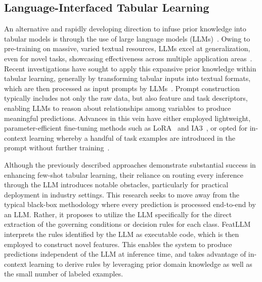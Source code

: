 \subsection{Language-Interfaced Tabular Learning}

An alternative and rapidly developing direction to infuse prior knowledge into tabular models is through the use of large language models (LLMs)~\cite{anil2023palm,openai2023gpt4}. Owing to pre-training on massive, varied textual resources, LLMs excel at generalization, even for novel tasks, showcasing effectiveness across multiple application areas~\cite{brown2020language}. Recent investigations have sought to apply this expansive prior knowledge within tabular learning, generally by transforming tabular inputs into textual formats, which are then processed as input prompts by LLMs~\cite{dinh2022lift,hegselmann2023tabllm,wang2023anypredict}. Prompt construction typically includes not only the raw data, but also feature and task descriptors, enabling LLMs to reason about relationships among variables to produce meaningful predictions. Advances in this vein have either employed lightweight, parameter-efficient fine-tuning methods such as LoRA~\cite{hu2021lora} and IA3~\cite{liu2022few}, or opted for in-context learning whereby a handful of task examples are introduced in the prompt without further training~\cite{dinh2022lift,hegselmann2023tabllm,nam2023semi,slack2023tablet}.

Although the previously described approaches demonstrate substantial success in enhancing few-shot tabular learning, their reliance on routing every inference through the LLM introduces notable obstacles, particularly for practical deployment in industry settings. This research seeks to move away from the typical black-box methodology where every prediction is processed end-to-end by an LLM. Rather, it proposes to utilize the LLM specifically for the direct extraction of the governing conditions or decision rules for each class. \textsf{FeatLLM} interprets the rules identified by the LLM as executable code, which is then employed to construct novel features. This enables the system to produce predictions independent of the LLM at inference time, and takes advantage of in-context learning to derive rules by leveraging prior domain knowledge as well as the small number of labeled examples.

